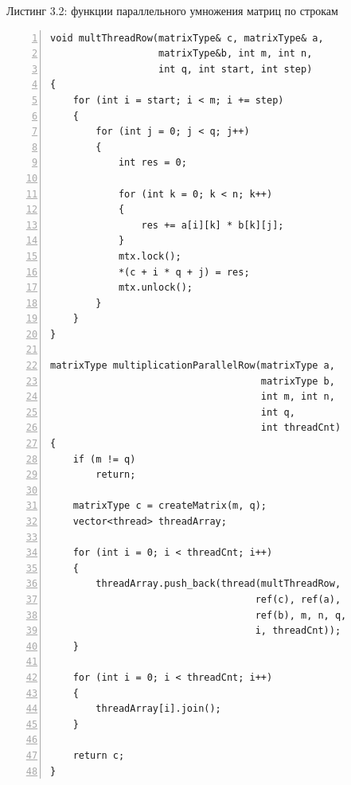 \documentclass[12pt,a4paper]{report}
\begin{document}
\textrm{Листинг 3.2: функции параллельного умножения матриц по строкам}
\begin{lstlisting}[frame=single, numbers=left]
void multThreadRow(matrixType& c, matrixType& a, 
                   matrixType&b, int m, int n, 
                   int q, int start, int step)
{
    for (int i = start; i < m; i += step)
    {
        for (int j = 0; j < q; j++)
        {
            int res = 0;
    
            for (int k = 0; k < n; k++)
            {
                res += a[i][k] * b[k][j];
            }
            mtx.lock();
            *(c + i * q + j) = res;
            mtx.unlock();
        }
    }
}
    
matrixType multiplicationParallelRow(matrixType a, 
                                     matrixType b, 
                                     int m, int n, 
                                     int q, 
                                     int threadCnt)
{
    if (m != q)
        return;

    matrixType c = createMatrix(m, q);
    vector<thread> threadArray;
    
    for (int i = 0; i < threadCnt; i++)
    {
        threadArray.push_back(thread(multThreadRow, 
                                    ref(c), ref(a), 
                                    ref(b), m, n, q, 
                                    i, threadCnt));
    }
    
    for (int i = 0; i < threadCnt; i++)
    {
        threadArray[i].join();
    }
    
    return c;
}
\end{lstlisting}
\end{document}
